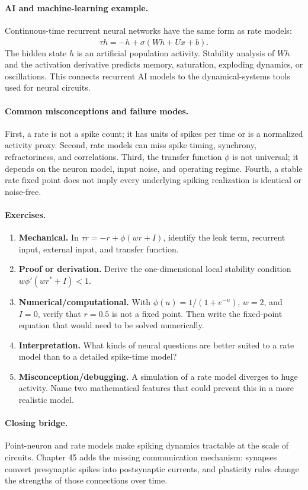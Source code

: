 \paragraph{AI and machine-learning example.}
Continuous-time recurrent neural networks have the same form as rate models:
\[
\tau \dot h=-h+\sigma(Wh+Ux+b).
\]
The hidden state \(h\) is an artificial population activity. Stability analysis of \(Wh\) and the activation derivative predicts memory, saturation, exploding dynamics, or oscillations. This connects recurrent AI models to the dynamical-systems tools used for neural circuits.

\paragraph{Common misconceptions and failure modes.}
First, a rate is not a spike count; it has units of spikes per time or is a normalized activity proxy. Second, rate models can miss spike timing, synchrony, refractoriness, and correlations. Third, the transfer function \(\phi\) is not universal; it depends on the neuron model, input noise, and operating regime. Fourth, a stable rate fixed point does not imply every underlying spiking realization is identical or noise-free.

\paragraph{Exercises.}
\begin{enumerate}[label=\textbf{44.4.\arabic*.}, leftmargin=*]
\item \textbf{Mechanical.} In \(\tau\dot r=-r+\phi(wr+I)\), identify the leak term, recurrent input, external input, and transfer function.
\item \textbf{Proof or derivation.} Derive the one-dimensional local stability condition \(w\phi'(wr^*+I)<1\).
\item \textbf{Numerical/computational.} With \(\phi(u)=1/(1+e^{-u})\), \(w=2\), and \(I=0\), verify that \(r=0.5\) is not a fixed point. Then write the fixed-point equation that would need to be solved numerically.
\item \textbf{Interpretation.} What kinds of neural questions are better suited to a rate model than to a detailed spike-time model?
\item \textbf{Misconception/debugging.} A simulation of a rate model diverges to huge activity. Name two mathematical features that could prevent this in a more realistic model.
\end{enumerate}

\paragraph{Closing bridge.}
Point-neuron and rate models make spiking dynamics tractable at the scale of circuits. Chapter 45 adds the missing communication mechanism: synapses convert presynaptic spikes into postsynaptic currents, and plasticity rules change the strengths of those connections over time.

\clearpage
